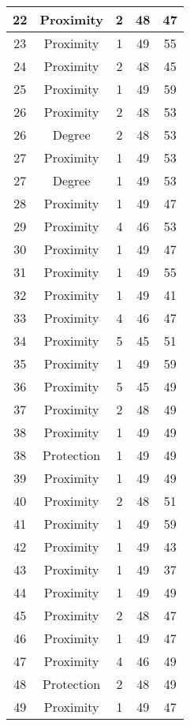 \documentclass[results.tex]{subfiles}
\begin{document}
\begin{center}
\begin{tabular}{| c || c | c | c | c |}
    \hline
    22 & Proximity & 2 & 48 & 47 \\ 
    \hline
    23 & Proximity & 1 & 49 & 55 \\ 
    \hline
    24 & Proximity & 2 & 48 & 45 \\ 
    \hline
    25 & Proximity & 1 & 49 & 59 \\ 
    \hline
    26 & Proximity & 2 & 48 & 53 \\ 
    \hline
    26 & Degree & 2 & 48 & 53 \\ 
    \hline
    27 & Proximity & 1 & 49 & 53 \\ 
    \hline
    27 & Degree & 1 & 49 & 53 \\ 
    \hline
    28 & Proximity & 1 & 49 & 47 \\ 
    \hline
    29 & Proximity & 4 & 46 & 53 \\ 
    \hline
    30 & Proximity & 1 & 49 & 47 \\ 
    \hline
    31 & Proximity & 1 & 49 & 55 \\ 
    \hline
    32 & Proximity & 1 & 49 & 41 \\ 
    \hline
    33 & Proximity & 4 & 46 & 47 \\ 
    \hline
    34 & Proximity & 5 & 45 & 51 \\ 
    \hline
    35 & Proximity & 1 & 49 & 59 \\ 
    \hline
    36 & Proximity & 5 & 45 & 49 \\ 
    \hline
    37 & Proximity & 2 & 48 & 49 \\ 
    \hline
    38 & Proximity & 1 & 49 & 49 \\ 
    \hline
    38 & Protection & 1 & 49 & 49 \\ 
    \hline
    39 & Proximity & 1 & 49 & 49 \\ 
    \hline
    40 & Proximity & 2 & 48 & 51 \\ 
    \hline
    41 & Proximity & 1 & 49 & 59 \\ 
    \hline
    42 & Proximity & 1 & 49 & 43 \\ 
    \hline
    43 & Proximity & 1 & 49 & 37 \\ 
    \hline
    44 & Proximity & 1 & 49 & 49 \\ 
    \hline
    45 & Proximity & 2 & 48 & 47 \\ 
    \hline
    46 & Proximity & 1 & 49 & 47 \\ 
    \hline
    47 & Proximity & 4 & 46 & 49 \\ 
    \hline
    48 & Protection & 2 & 48 & 49 \\ 
    \hline
    49 & Proximity & 1 & 49 & 47 \\ 
    \hline   \end{tabular}
\end{center}
\end{document}
